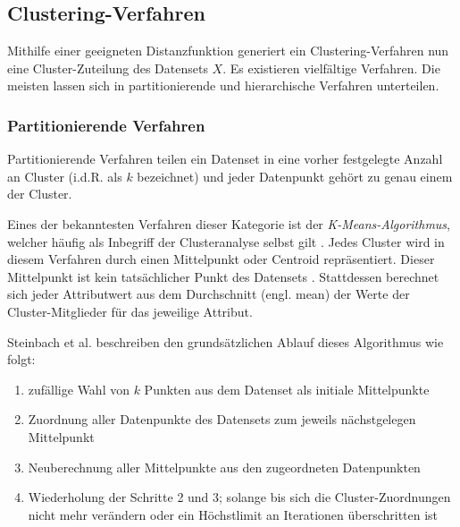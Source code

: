\hypertarget{clustering-verfahren}{%
\subsection{Clustering-Verfahren}\label{clustering-verfahren}}

Mithilfe einer geeigneten Distanzfunktion generiert ein
Clustering-Verfahren nun eine Cluster-Zuteilung des Datensets \(X\). Es
existieren vielfältige Verfahren. Die meisten lassen sich in
partitionierende und hierarchische Verfahren unterteilen. \autocite[Kap.
1.3 Which Clustering Algorithm to Choose]{kaufman2009}

\hypertarget{partitionierende-verfahren}{%
\subsubsection{Partitionierende
Verfahren}\label{partitionierende-verfahren}}

Partitionierende Verfahren teilen ein Datenset in eine vorher
festgelegte Anzahl an Cluster (i.d.R. als \(k\) bezeichnet) und jeder
Datenpunkt gehört zu genau einem der Cluster. \autocite[Kap. 1.3.1
Partitioning Methods]{kaufman2009}

Eines der bekanntesten Verfahren dieser Kategorie ist der
\emph{K-Means-Algorithmus}, welcher häufig als Inbegriff der
Clusteranalyse selbst gilt \autocite{huang1998}. Jedes Cluster wird in
diesem Verfahren durch einen Mittelpunkt oder Centroid repräsentiert.
Dieser Mittelpunkt ist kein tatsächlicher Punkt des Datensets
\autocite{steinbach2000}. Stattdessen berechnet sich jeder Attributwert
aus dem Durchschnitt (engl. mean) der Werte der Cluster-Mitglieder für
das jeweilige Attribut. \autocite[Kap. 4.5 K-Means Algorithm]{king2015}

Steinbach et al. \autocite{steinbach2000} beschreiben den
grundsätzlichen Ablauf dieses Algorithmus wie folgt:

\begin{enumerate}
\def\labelenumi{\arabic{enumi}.}
\tightlist
\item
  zufällige Wahl von \(k\) Punkten aus dem Datenset als initiale
  Mittelpunkte
\item
  Zuordnung aller Datenpunkte des Datensets zum jeweils nächstgelegen
  Mittelpunkt
\item
  Neuberechnung aller Mittelpunkte aus den zugeordneten Datenpunkten
\item
  Wiederholung der Schritte 2 und 3; solange bis sich die
  Cluster-Zuordnungen nicht mehr verändern oder ein Höchstlimit an
  Iterationen überschritten ist
\end{enumerate}

